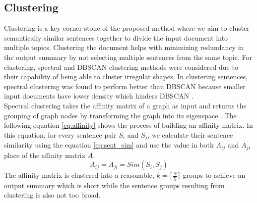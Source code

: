 \subsection{Clustering}\label{subsec:clustering}
Clustering is a key corner stone of the proposed method where we aim to cluster semantically similar sentences together to divide the input document into multiple topics. Clustering the document helps with minimizing redundancy in the output summary by not selecting multiple sentences from the same topic. For clustering, spectral and DBSCAN clustering methods were considered due to their capability of being able to cluster irregular shapes. In clustering sentences, spectral clustering was found to perform better than DBSCAN because smaller input documents have lower density which hinders DBSCAN \cite{roychowdhury-etal-2022-spectral-base}.\\

Spectral clustering takes the affinity matrix of a graph as input and returns the grouping of graph nodes by transforming the graph into its eigenspace \cite{vonLuxburg-2007-spectral-tutorial}. The following equation \ref{eq:affinity} shows the process of building an affinity matrix. In this equation, for every sentence pair $S_i$ and $S_j$, we calculate their sentence similarity using the equation \ref{eq:sent_sim} and use the value in both $A_{ij}$ and $A_{ji}$ place of the affinity matrix $A$.
\begin{equation}\label{eq:affinity}
    A_{ij}=A_{ji}=Sim(S_i,S_j)
\end{equation}
The affinity matrix is clustered into a reasonable, $k=\lceil\frac{N}{5}\rceil$ groups to achieve an output summary which is short while the sentence groups resulting from clustering is also not too broad.

